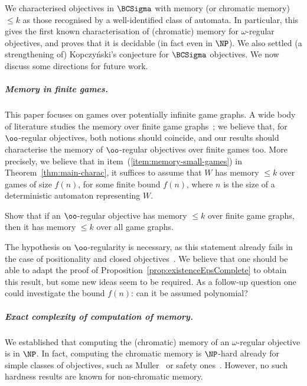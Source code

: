 
We characterised objectives in $\BCSigma$ with memory (or chromatic memory) $\leq k$ as those recognised by a well-identified class of automata.
In particular, this gives the first known characterisation of (chromatic) memory for $\omega$-regular objectives, and proves that it is decidable (in fact even in $\NP$).
We also settled (a strengthening of) Kopczyński's conjecture for $\BCSigma$ objectives.
We now discuss some directions for future work.

\subparagraph*{Memory in finite games.}
This paper focuses on games over potentially infinite game graphs. 
A wide body of literature studies the memory over finite game graphs~\cite{Kop08Thesis,BRORV22}; we believe that, for $\oo$-regular objectives, both notions should coincide, and our results should characterise the memory of $\oo$-regular objectives over finite games too. 
More precisely, we believe that in item~(\ref{item:memory-small-games}) in Theorem~\ref{thm:main-charac}, it suffices to assume that $W$ has memory $\leq k$ over games of size $f(n)$, for some finite bound $f(n)$, where $n$ is the size of a deterministic automaton representing $W$. %

\begin{question}\label{quest:ptime}
	Show that if an $\oo$-regular objective has memory $\leq k$ over finite game graphs, then it has memory $\leq k$ over all game graphs.
\end{question}

The hypothesis on $\oo$-regularity is necessary, as this statement already fails in the case of positionality and closed objectives~\cite{CFH14}.
We believe that one should be able to adapt the proof of Proposition~\ref{prop:existenceEpsComplete} to obtain this result, but some new ideas seem to be required.
As a follow-up question one could investigate the bound $f(n)$: can it be assumed polynomial?


\subparagraph*{Exact complexity of computation of memory.} We established that computing the (chromatic) memory of an $\omega$-regular objective is in $\NP$.
In fact, computing the chromatic memory is $\NP$-hard already for simple classes of objectives, such as Muller~\cite{Casares22Chromatic} or safety ones~\cite{BFRV23Regular}.
However, no such hardness results are known for non-chromatic memory.

